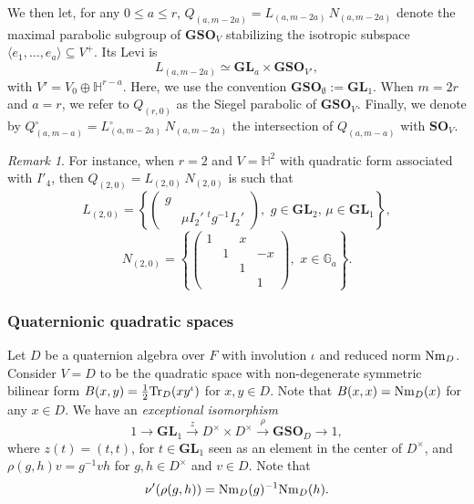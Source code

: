 \documentclass[11pt, reqno]{amsart}
\theoremstyle{plain}
\theoremstyle{definition}
\theoremstyle{remark}
\newtheorem{remark}[theorem]{Remark}
\theoremstyle{plain}
\def\SO{{\mathbf{SO}}}
\def\GSO{{\mathbf{GSO}}}
\def\GL{\mathbf{GL}}
\begin{document}
We then let, for any $0 \leq a \leq r$, $Q_{(a , m-2a)} = L_{(a , m-2a)}\, N_{(a , m-2a)}$ denote the maximal parabolic subgroup of $\mathbf{GSO}_V$ stabilizing the isotropic subspace $\langle e_1, \dots, e_a \rangle  \subseteq V^+$. Its Levi is $$L_{(a , m-2a)} \simeq \GL_a \times \mathbf{GSO}_{V'},$$ with $V' = V_0 \oplus \mathbb{H}^{r-a}$. Here, we use the convention $\GSO_{\emptyset} := \GL_1$. When $m = 2r$ and $a=r$, we refer to $Q_{(r , 0)}$ as the Siegel parabolic of $\mathbf{GSO}_{V}$.  Finally, we denote by $Q^\circ_{(a,m-a)} = L^\circ_{(a , m-2a)}\, N_{(a , m-2a)}$ the intersection of $Q_{(a,m-a)}$ with $\SO_{V}$.

\begin{remark}\label{remark_stupid_on_Siegel_parabolic_so22}
For instance, when $r = 2$ and $V = \mathbb{H}^2$ with quadratic form associated with $I'_4$, then $Q_{(2,0)} = L_{(2,0)}\, N_{(2,0)} $ is such that 
\[L_{(2,0)} = \left \{ \left(\begin{smallmatrix} g  & \\ &\mu I_2'\;^{t}g^{-1}I_2'\end{smallmatrix}\right), \,\, g \in \GL_2, \, \mu \in \GL_1 \right \},\]
\[N_{(2,0)} = \left \{ \left(\begin{smallmatrix} 1 & & x & \\ & 1 & & -x\\ & & 1 & \\ & & & 1 \end{smallmatrix}\right), \,\, x \in \mathbb{G}_a \right \}.\]
\end{remark}

\subsubsection{Quaternionic quadratic spaces}\label{Exceptional:Isom:Section}
Let $D$ be a quaternion algebra over $F$ with involution $\iota$ and reduced norm ${\rm Nm}_{D}$. Consider $V=D$ to be the quadratic space with non-degenerate symmetric bilinear form $B(x,y) = \frac{1}{2}{\rm Tr}_{D}(x y^{\iota})$ for $x, y \in D$. Note that $B(x,x) = {\rm Nm}_{D}(x)$ for any $x \in D$. We have an \emph{exceptional isomorphism}  
$$ 1 \to \GL_1 \xrightarrow{z} D^\times \times D^\times \xrightarrow{\rho} \mathbf{GSO}_D \to 1,$$
where $z(t) = (t,t)$, for $t \in \GL_1$ seen as an element in the center of $D^\times$, and $\rho(g,h) v = g^{-1} v h$ for $g,h \in D^\times$ and $v \in D$. Note that $$\nu' (\rho(g,h) ) =  {\rm Nm}_{D}(g)^{-1}{\rm Nm}_{D}(h).$$
\end{document}
